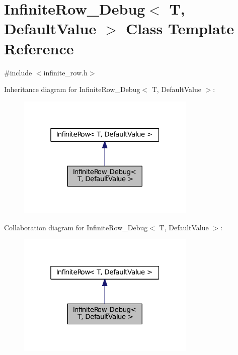 \hypertarget{classInfiniteRow__Debug}{}\section{Infinite\+Row\+\_\+\+Debug$<$ T, Default\+Value $>$ Class Template Reference}
\label{classInfiniteRow__Debug}


{\ttfamily \#include $<$infinite\+\_\+row.\+h$>$}



Inheritance diagram for Infinite\+Row\+\_\+\+Debug$<$ T, Default\+Value $>$\+:
\nopagebreak
\begin{figure}[H]
\begin{center}
\leavevmode
\includegraphics[width=241pt]{classInfiniteRow__Debug__inherit__graph}
\end{center}
\end{figure}


Collaboration diagram for Infinite\+Row\+\_\+\+Debug$<$ T, Default\+Value $>$\+:
\nopagebreak
\begin{figure}[H]
\begin{center}
\leavevmode
\includegraphics[width=241pt]{classInfiniteRow__Debug__coll__graph}
\end{center}
\end{figure}

